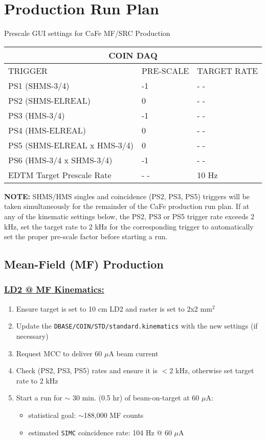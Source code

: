 \documentclass{article}
\begin{document}
\section{Production Run Plan} 
    \begin{center}
    Prescale GUI settings for CaFe MF/SRC Production
    \begin{tabular}{ |p{6cm}| |p{3cm}| |p{3cm}| }
    \hline
    \multicolumn{3}{|c|}{COIN DAQ} \\
    \hline
    TRIGGER & PRE-SCALE & TARGET RATE\\
    \hline
    PS1 (SHMS-3/4)    & -1  & - - \\
    PS2 (SHMS-ELREAL) &  0  & - - \\
    PS3 (HMS-3/4)     & -1  & - -\\
    PS4 (HMS-ELREAL)  & 0  & - - \\
    PS5 (SHMS-ELREAL x HMS-3/4)  & 0 & - -  \\
    PS6 (HMS-3/4 x SHMS-3/4)     & -1 & - -  \\
    \hline
    EDTM Target Prescale Rate & - - & 10 Hz \\
    \hline
    \end{tabular}
    \end{center}
    \textbf{NOTE:} SHMS/HMS singles and coincidence (PS2, PS3, PS5) triggers will be taken simultaneously for the remainder of the CaFe production run plan. If at any of the kinematic settings below, the PS2, PS3 or PS5 trigger rate exceeds 2 kHz, set the target rate to 2 kHz for the corresponding trigger to automatically set the proper pre-scale factor before starting a run.
\subsection{Mean-Field (MF) Production}
\subsubsection*{\underline{LD2 @ MF Kinematics:}}
\begin{enumerate}
\item Ensure target is set to 10 cm LD2 and raster is set to 2x2 mm$^{2}$
\item Update the \texttt{DBASE/COIN/STD/standard.kinematics} with the new settings (if necessary)
\item Request MCC to deliver 60 $\mu$A beam current
\item Check (PS2, PS3, PS5) rates and ensure it is $<$2 kHz, otherwise set target rate to 2 kHz
\item Start a run for $\sim$ 30 min. (0.5 hr) of beam-on-target at 60 $\mu$A:
\begin{itemize}
    \item statistical goal: $\sim$188,000 MF counts
    \item estimated \texttt{SIMC} coincidence rate: 104 Hz @ 60 $\mu$A
\end{itemize}
\end{enumerate}
\end{document}
